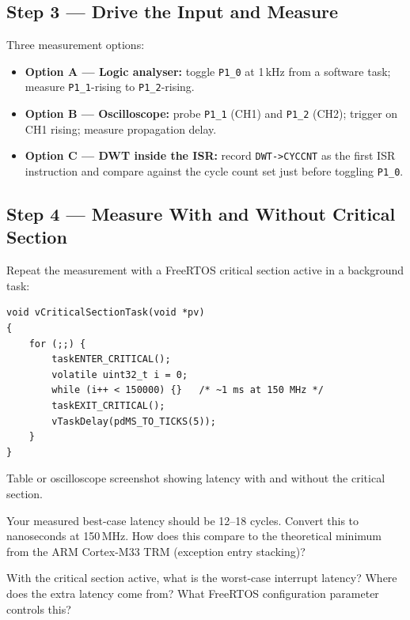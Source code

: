 \documentclass[11pt, a4paper]{article}
\begin{document}
\subsection{Step 3 --- Drive the Input and Measure}

Three measurement options:

\begin{itemize}[noitemsep, leftmargin=*]
  \item \textbf{Option A --- Logic analyser:} toggle \texttt{P1\_0} at 1\,kHz from a
        software task; measure \texttt{P1\_1}-rising to \texttt{P1\_2}-rising.
  \item \textbf{Option B --- Oscilloscope:} probe \texttt{P1\_1} (CH1) and
        \texttt{P1\_2} (CH2); trigger on CH1 rising; measure propagation delay.
  \item \textbf{Option C --- DWT inside the ISR:} record \texttt{DWT->CYCCNT} as the
        first ISR instruction and compare against the cycle count set just before
        toggling \texttt{P1\_0}.
\end{itemize}

\subsection{Step 4 --- Measure With and Without Critical Section}

Repeat the measurement with a FreeRTOS critical section active in a background task:

\begin{lstlisting}[style=cstyle]
void vCriticalSectionTask(void *pv)
{
    for (;;) {
        taskENTER_CRITICAL();
        volatile uint32_t i = 0;
        while (i++ < 150000) {}   /* ~1 ms at 150 MHz */
        taskEXIT_CRITICAL();
        vTaskDelay(pdMS_TO_TICKS(5));
    }
}
\end{lstlisting}

\begin{checkpointbox}[~B]
  Table or oscilloscope screenshot showing latency with and without the critical
  section.
\end{checkpointbox}

\begin{questionbox}[~B1]
  Your measured best-case latency should be 12--18 cycles. Convert this to nanoseconds
  at 150\,MHz. How does this compare to the theoretical minimum from the ARM
  Cortex-M33 TRM (exception entry stacking)?
\end{questionbox}

\begin{questionbox}[~B2]
  With the critical section active, what is the worst-case interrupt latency? Where does
  the extra latency come from? What FreeRTOS configuration parameter controls this?
\end{questionbox}
\end{document}
